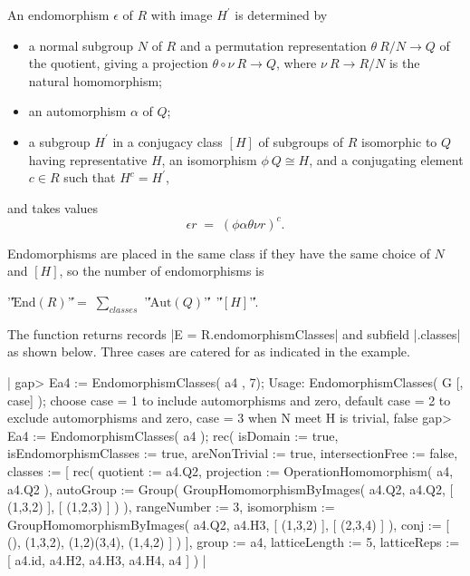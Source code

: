 An endomorphism $\epsilon$ of  $R$  with image $H^{\prime}$ is determined by
\begin{itemize}
\item  a normal subgroup $N$ of $R$ and a permutation representation 
       $\theta \: R/N \to Q$  of the quotient,
       giving a projection  $\theta \circ \nu \: R \to Q $,
       where  $\nu \: R \to R/N$  is the natural homomorphism;
\item  an automorphism  $\alpha$  of  $Q$;
\item  a subgroup  $H^{\prime}$  in a conjugacy class  $[H]$
       of subgroups of  $R$
       isomorphic to  $Q$  having representative  $H$,
       an isomorphism  $\phi \: Q \cong H$,
       and a conjugating element  $c \in R$
       such that  $H^c = H^{\prime}$,
\end{itemize}
and takes values
$$\epsilon r \; = \; (\phi \alpha \theta \nu r)^c.$$

Endomorphisms are placed  in  the same  class  if they  have the  same
choice of $N$ and $[H]$, so the number of endomorphisms is
\begin{center}
'\|'$\mathrm{End}(R)$'\|'$ = \; \sum_{classes}$
'\|'$\mathrm{Aut}(Q)$'\|'\ '\|'$[H]$'\|'.
\end{center}
The function returns records |E  = R.endomorphismClasses| and subfield
|.classes| as  shown below.  Three  cases are catered for as indicated
in the example.

|    gap> Ea4 := EndomorphismClasses( a4 , 7);
    Usage:  EndomorphismClasses( G [, case] );
     choose  case = 1  to include automorphisms and zero,
    default  case = 2  to exclude automorphisms and zero,
             case = 3  when  N meet H  is trivial,
    false
    gap> Ea4 := EndomorphismClasses( a4 );
    rec(
      isDomain := true,
      isEndomorphismClasses := true,
      areNonTrivial := true,
      intersectionFree := false,
      classes := [ rec(
              quotient := a4.Q2,
              projection := OperationHomomorphism( a4, a4.Q2 ),
              autoGroup := Group( GroupHomomorphismByImages( a4.Q2, a4.Q2, 
                [ (1,3,2) ], [ (1,2,3) ] ) ),
              rangeNumber := 3,
              isomorphism := GroupHomomorphismByImages( a4.Q2, a4.H3, 
                [ (1,3,2) ], [ (2,3,4) ] ),
              conj := [ (), (1,3,2), (1,2)(3,4), (1,4,2) ] ) ],
      group := a4,
      latticeLength := 5,
      latticeReps := [ a4.id, a4.H2, a4.H3, a4.H4, a4 ] ) |

%

